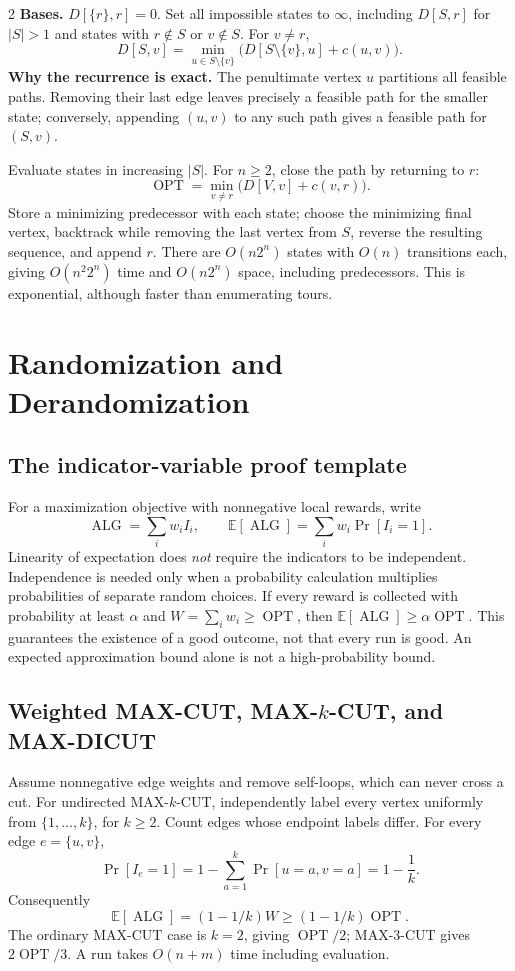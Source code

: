 \documentclass[10pt]{article}
\theoremstyle{definition}
\newcommand{\OPT}{\operatorname{OPT}}
\newcommand{\ALG}{\operatorname{ALG}}
\begin{document}
\begin{multicols*}{2}
\textbf{Bases.} $D[\{r\},r]=0$.  Set all impossible states to $\infty$,
including $D[S,r]$ for $|S|>1$ and states with $r\notin S$ or $v\notin S$.
For $v\ne r$,
\[
\boxed{\ D[S,v]=\min_{u\in S\setminus\{v\}}
        \bigl(D[S\setminus\{v\},u]+c(u,v)\bigr).\ }
\]
\textbf{Why the recurrence is exact.} The penultimate vertex $u$ partitions
all feasible paths.  Removing their last edge leaves precisely a feasible
path for the smaller state; conversely, appending $(u,v)$ to any such path
gives a feasible path for $(S,v)$.

Evaluate states in increasing $|S|$.  For $n\ge2$, close the path by returning
to $r$:
\[
\OPT=\min_{v\ne r}\bigl(D[V,v]+c(v,r)\bigr).
\]
Store a minimizing predecessor with each state; choose the minimizing final
vertex, backtrack while removing the last vertex from $S$, reverse the
resulting sequence, and append $r$.  There are $O(n2^n)$ states with $O(n)$
transitions each, giving $O(n^2 2^n)$ time and $O(n2^n)$ space, including
predecessors.  This is exponential, although faster than enumerating tours.


\clearpage

\section{Randomization and Derandomization}\label{ra:main}

\subsection{The indicator-variable proof template}
For a maximization objective with nonnegative local rewards, write
\[
  \ALG=\sum_i w_i I_i,\qquad
  \mathbb E[\ALG]=\sum_i w_i\Pr[I_i=1].
\]
Linearity of expectation does \emph{not} require the indicators to be
independent. Independence is needed only when a probability calculation
multiplies probabilities of separate random choices. If every reward is
collected with probability at least $\alpha$ and
$W=\sum_iw_i\ge\OPT$, then $\mathbb E[\ALG]\ge\alpha\OPT$.
This guarantees the existence of a good outcome, not that every run is good.
An expected approximation bound alone is not a high-probability bound.

\subsection{Weighted MAX-CUT, MAX-\texorpdfstring{$k$}{k}-CUT, and MAX-DICUT}
Assume nonnegative edge weights and remove self-loops, which can never cross
a cut. For undirected MAX-$k$-CUT, independently label every vertex uniformly
from $\{1,\ldots,k\}$, for $k\ge2$. Count edges whose endpoint labels differ.
For every edge $e=\{u,v\}$,
\[
  \Pr[I_e=1]=1-\sum_{a=1}^k\Pr[u=a,v=a]=1-\frac1k.
\]
Consequently
\[
  \mathbb E[\ALG]=(1-1/k)W\ge(1-1/k)\OPT.
\]
The ordinary MAX-CUT case is $k=2$, giving $\OPT/2$; MAX-3-CUT gives
$2\OPT/3$. A run takes $O(n+m)$ time including evaluation.


\end{multicols*}
\end{document}
